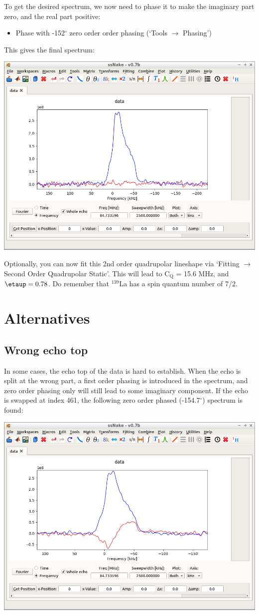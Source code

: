 \documentclass[11pt,a4paper]{article}
\begin{document}
To get the desired spectrum, we now need to phase it to make the imaginary part zero, and the real part positive:
\begin{itemize}
\item Phase with -152$^\circ$ zero order order phasing (`Tools $\longrightarrow$ Phasing')
\end{itemize}
This gives the final spectrum:
\begin{center}
\includegraphics[width=0.8\linewidth]{Figs/Fig4.png}
\end{center}

Optionally, you can now fit this 2nd order quadrupolar lineshape via `Fitting $\longrightarrow$ Second Order Quadrupolar Static'. This will lead to C$_\text{Q}$ = 15.6 MHz, and $\etaup = 0.78$. Do remember that $^{139}$La has a spin quantum number of 7/2.

\section{Alternatives}
\subsection{Wrong echo top}
In some cases, the echo top of the data is hard to establish. When the echo is split at the wrong part, a first order phasing is introduced in the spectrum, and zero order phasing only will still lead to some imaginary component. If the echo is swapped at index 461, the following zero order phased (-154.7$^\circ$) spectrum is found:
\begin{center}
\includegraphics[width=0.8\linewidth]{Figs/Fig5.png}
\end{center}
\end{document}
